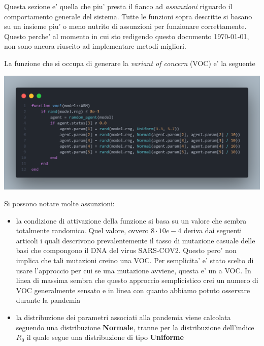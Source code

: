 Questa sezione e' quella che piu' presta il fianco ad \emph{assunzioni} riguardo 
il comportamento generale del sistema. Tutte le funzioni sopra descritte si basano su un insieme
piu' o meno nutrito di assunzioni per funzionare correttamente. Questo perche' al momento in cui sto 
redigendo questo documento \today, non sono ancora riuscito ad implementare metodi migliori. 

La funzione che si occupa di generare la \emph{variant of concern} (VOC) e' la seguente

\begin{minipage}{\linewidth}
	\centering
	\includegraphics[width=\textwidth]{img/voc.png}
	\label{fig:voc}
\end{minipage}

Si possono notare molte assunzioni:
\begin{itemize}
	\item la condizione di attivazione della funzione si basa su un valore
	che sembra totalmente randomico. Quel valore, ovvero $8 \cdot 10e-4$ deriva dai
	seguenti articoli \cite{Markov2023} \cite{https://doi.org/10.1002/jmv.27331} \cite{Abavisani2022}
	i quali descrivono prevalentemente il tasso di mutazione casuale delle basi che compongono
	il DNA del virus SARS-COV2. Questo pero' non implica che tali mutazioni 
	creino una VOC. Per semplicita' e' stato scelto di usare l'approccio per cui
	se una mutazione avviene, questa e' un a VOC. In linea di massima sembra che 
	questo approccio semplicistico crei un numero di VOC generalmente sensato e 
	in linea con quanto abbiamo potuto osservare durante la pandemia
	\item la distribuzione dei parametri associati alla pandemia viene calcolata
	seguendo una distribuzione \textbf{Normale}, tranne per la distribuzione dell'indice $R_0$
	il quale segue una distribuzione di tipo \textbf{Uniforme} \cite{wiki:Numero_di_riproduzione_di_base}
\end{itemize}

